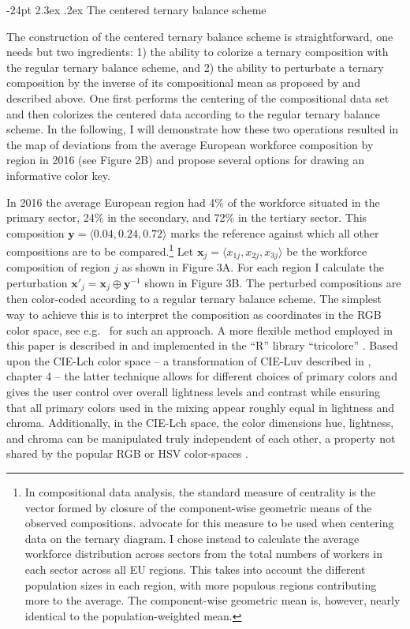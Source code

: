 \documentclass[10pt, twoside, parskip=half]{article}
\makeatletter
\renewcommand\section{\@startsection {section}{1}{\z@}%
                                   {-24pt}%
                                   {2.3ex \@plus.2ex}%
                                   {\normalfont\large\bfseries}}
\makeatother
\begin{document}
\hypertarget{the-centered-ternary-balance-scheme}{%
\section{The centered ternary balance
scheme}\label{the-centered-ternary-balance-scheme}}

The construction of the centered ternary balance scheme is
straightforward, one needs but two ingredients: 1) the ability to
colorize a ternary composition with the regular ternary balance scheme,
and 2) the ability to perturbate a ternary composition by the inverse of
its compositional mean as proposed by \citet{VonEynatten2002} and
described above. One first performs the centering of the compositional
data set and then colorizes the centered data according to the regular
ternary balance scheme. In the following, I will demonstrate how these
two operations resulted in the map of deviations from the average
European workforce composition by region in 2016 (see Figure 2B) and
propose several options for drawing an informative color key.

In 2016 the average European region had 4\% of the workforce situated in
the primary sector, 24\% in the secondary, and 72\% in the tertiary
sector. This composition \(\mathbf{y}=\langle 0.04, 0.24, 0.72 \rangle\)
marks the reference against which all other compositions are to be
compared.\footnote{In compositional data analysis, the standard measure
  of centrality is the vector formed by closure of the component-wise
  geometric means of the observed compositions. \citet{VonEynatten2002}
  advocate for this measure to be used when centering data on the
  ternary diagram. I chose instead to calculate the average workforce
  distribution across sectors from the total numbers of workers in each
  sector across all EU regions. This takes into account the different
  population sizes in each region, with more populous regions
  contributing more to the average. The component-wise geometric mean
  is, however, nearly identical to the population-weighted mean. } Let
\(\mathbf{x}_j = \langle x_{1j}, x_{2j}, x_{3j} \rangle\) be the
workforce composition of region \(j\) as shown in Figure 3A. For each
region I calculate the perturbation
\(\mathbf{x}'_j = \mathbf{x}_j \oplus \mathbf{y}^{-1}\) shown in Figure
3B. The perturbed compositions are then color-coded according to a
regular ternary balance scheme. The simplest way to achieve this is to
interpret the composition as coordinates in the RGB color space, see
e.g.~\citet{Wang2009} for such an approach. A more flexible method
employed in this paper is described in \citet{Schoeley2017} and
implemented in the ``R'' library ``tricolore'' \citep{Schoeley2019a}.
Based upon the CIE-Lch color space -- a transformation of CIE-Luv
described in \citet{Ware2013}, chapter 4 -- the latter technique allows
for different choices of primary colors and gives the user control over
overall lightness levels and contrast while ensuring that all primary
colors used in the mixing appear roughly equal in lightness and chroma.
Additionally, in the CIE-Lch space, the color dimensions hue, lightness,
and chroma can be manipulated truly independent of each other, a
property not shared by the popular RGB or HSV color-spaces
\citep{Zeileis2009}.
\end{document}
